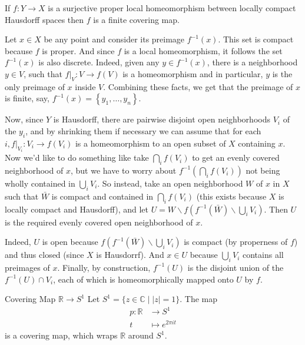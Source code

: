 \documentclass{report}
\begin{document}
\begin{proposition}{}{}
	If $f: Y \rightarrow X$ is a surjective proper local homeomorphism between locally compact Hausdorff spaces then $f$ is a finite covering map.
\end{proposition}
\begin{prf}
	Let $x \in X$ be any point and consider its preimage $f^{-1}(x)$. This set is compact because $f$ is proper. And since $f$ is a local homeomorphism, it follows the set $f^{-1}(x)$ is also discrete. Indeed, given any $y \in f^{-1}(x)$, there is a neighborhood $y \in V$, such that $\left.f\right|_V: V \rightarrow f(V)$ is a homeomorphism and in particular, $y$ is the only preimage of $x$ inside $V$. Combining these facts, we get that the preimage of $x$ is finite, say, $f^{-1}(x)=\left\{y_1, \ldots, y_n\right\}$.

	Now, since $Y$ is Hausdorff, there are pairwise disjoint open neighborhoods $V_i$ of the $y_i$, and by shrinking them if necessary we can assume that for each $i,\left.f\right|_{V_i}: V_i \rightarrow f\left(V_i\right)$ is a homeomorphism to an open subset of $X$ containing $x$. Now we'd like to do something like take $\bigcap_i f\left(V_i\right)$ to get an evenly covered neighborhood of $x$, but we have to worry about $f^{-1}\left(\bigcap_i f\left(V_i\right)\right)$ not being wholly contained in $\bigcup_i V_i$. So instead, take an open neighborhood $W$ of $x$ in $X$ such that $\bar{W}$ is compact and contained in $\bigcap_i f\left(V_i\right)$ (this exists because $X$ is locally compact and Hausdorff), and let $U=W \backslash f\left(f^{-1}(\bar{W}) \backslash \bigcup_i V_i\right)$. Then $U$ is the required evenly covered open neighborhood of $x$.

	Indeed, $U$ is open because $f\left(f^{-1}(\bar{W}) \backslash \bigcup_i V_i\right)$ is compact (by properness of $f$) and thus closed (since $X$ is Hausdorrf). And $x \in U$ because $\bigcup_i V_i$ contains all preimages of $x$. Finally, by construction, $f^{-1}(U)$ is the disjoint union of the $f^{-1}(U) \cap V_i$, each of which is homeomorphically mapped onto $U$ by $f$.
\end{prf}

\begin{example}{Covering Map $\mathbb{R}\to S^1$}{}
	Let $S^1=\{z\in\mathbb{C}\mid |z|=1\}$. The map
	\begin{align*}
		p:\mathbb{R} & \longrightarrow S^1      \\
		t            & \longmapsto e^{2\pi i t}
	\end{align*}
	is a covering map, which wraps $\mathbb{R}$ around $S^1$.
\end{example}
\end{document}
